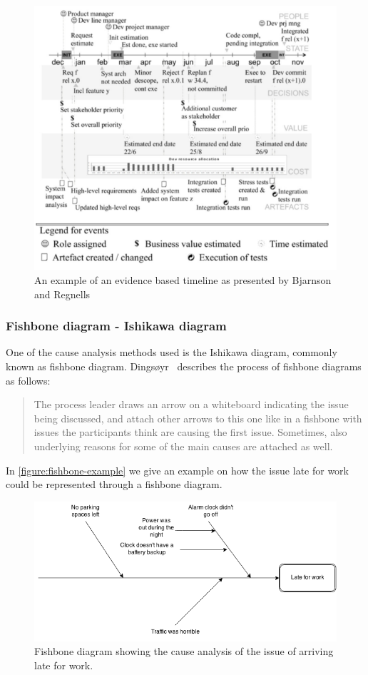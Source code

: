 \documentclass[12pt]{article}
\begin{document}
\begin{figure}[ht!]
	\centering
	\includegraphics[width=\textwidth]{figures/timeline-derby.png}
	\caption{An example of an evidence based timeline as presented by Bjarnson and Regnells~\cite{Bjarnason2012}}
	\label{figure:Timeline-Derby}
\end{figure}

\subsubsection{Fishbone diagram - Ishikawa diagram}
One of the cause analysis methods used is the Ishikawa diagram, commonly known as fishbone diagram. Dingsøyr~\cite{Dingsoyr2005} describes the process of fishbone diagrams as follows:
\begin{quote} The process leader draws an arrow on a whiteboard indicating the issue being discussed, and attach other arrows to this one like in a fishbone with issues the participants think are causing the first issue. Sometimes, also underlying reasons for some of the main causes are attached as well.
\end{quote}
In \autoref{figure:fishbone-example} we give an example on how the issue late for work could be represented through a fishbone diagram. 

\begin{figure}[h!]
	\centering
	\includegraphics[width=\textwidth]{figures/fishbone-example.png}
	\caption{Fishbone diagram showing the cause analysis of the issue of arriving late for work.}
	\label{figure:fishbone-example}
\end{figure}
\end{document}
